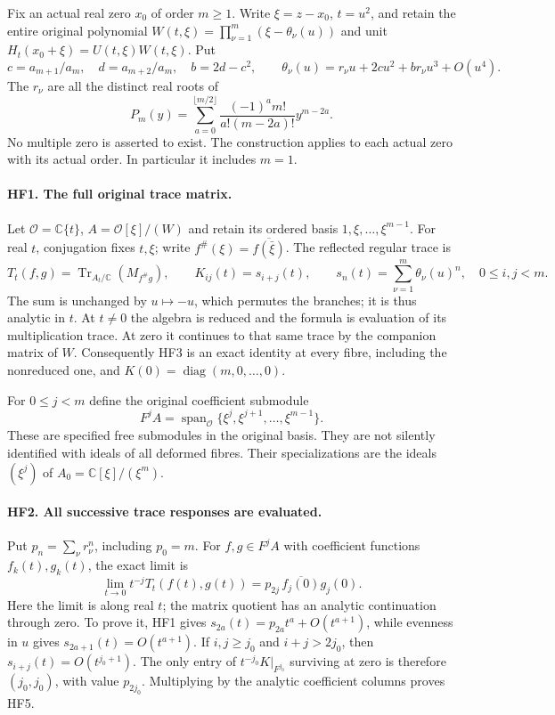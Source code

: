 \documentclass[11pt,a4paper]{article}
\theoremstyle{definition}\newtheorem{definition}[theorem]{Definition}
\begin{document}
Fix an actual real zero $x_0$ of order $m\ge1$. Write $\xi=z-x_0$,
$t=u^2$, and retain the entire original polynomial
$W(t,\xi)=\prod_{\nu=1}^m(\xi-\theta_\nu(u))$ and unit
$H_t(x_0+\xi)=U(t,\xi)W(t,\xi)$. Put
\[
 c=a_{m+1}/a_m,\quad d=a_{m+2}/a_m,\quad b=2d-c^2,
 \qquad
 \theta_\nu(u)=r_\nu u+2cu^2+b r_\nu u^3+O(u^4).
 \tag{HF1}
\]
The $r_\nu$ are all the distinct real roots of
\[
 P_m(y)=\sum_{a=0}^{\lfloor m/2\rfloor}
 \frac{(-1)^a m!}{a!(m-2a)!}y^{m-2a}.
 \tag{HF2}
\]
No multiple zero is asserted to exist. The construction applies to
each actual zero with its actual order. In particular it includes $m=1$.

\paragraph{HF1. The full original trace matrix.}
Let $\mathcal O=\mathbb C\{t\}$,
$A=\mathcal O[\xi]/(W)$ and retain its ordered basis
$1,\xi,\ldots,\xi^{m-1}$. For real $t$, conjugation fixes $t,\xi$;
write $f^\#(\xi)=\overline{f(\bar\xi)}$. The reflected regular trace is
\[
 T_t(f,g)=\operatorname{Tr}_{A_t/\mathbb C}(M_{f^\#g}),
 \qquad K_{ij}(t)=s_{i+j}(t),\qquad
 s_n(t)=\sum_{\nu=1}^m\theta_\nu(u)^n,
 \quad 0\le i,j<m.
 \tag{HF3}
\]
The sum is unchanged by $u\mapsto-u$, which permutes the branches;
it is thus analytic in $t$. At $t\ne0$ the algebra is reduced and
the formula is evaluation of its multiplication trace. At zero it
continues to that same trace by the companion matrix of $W$.
Consequently HF3 is an exact identity at every fibre, including
the nonreduced one, and $K(0)=\operatorname{diag}(m,0,\ldots,0)$.

For $0\le j<m$ define the original coefficient submodule
\[
 F^jA=\operatorname{span}_{\mathcal O}
          \{\xi^j,\xi^{j+1},\ldots,\xi^{m-1}\}.
 \tag{HF4}
\]
These are specified free submodules in the original basis. They
are not silently identified with ideals of all deformed fibres.
Their specializations are the ideals $(\xi^j)$ of
$A_0=\mathbb C[\xi]/(\xi^m)$.

\paragraph{HF2. All successive trace responses are evaluated.}
Put $p_n=\sum_\nu r_\nu^n$, including $p_0=m$. For $f,g\in F^jA$
with coefficient functions $f_k(t),g_k(t)$, the exact limit is
\[
 \boxed{\lim_{t\to0}t^{-j}T_t(f(t),g(t))
       =p_{2j}\,\overline{f_j(0)}g_j(0).}
 \tag{HF5}
\]
Here the limit is along real $t$; the matrix quotient has an analytic
continuation through zero. To prove it, HF1 gives
$s_{2a}(t)=p_{2a}t^a+O(t^{a+1})$, while evenness in $u$ gives
$s_{2a+1}(t)=O(t^{a+1})$. If $i,j\ge j_0$ and
$i+j>2j_0$, then $s_{i+j}(t)=O(t^{j_0+1})$.
The only entry of $t^{-j_0}K|_{F^{j_0}}$ surviving at zero is
therefore $(j_0,j_0)$, with value $p_{2j_0}$. Multiplying by the
analytic coefficient columns proves HF5.
\end{document}
